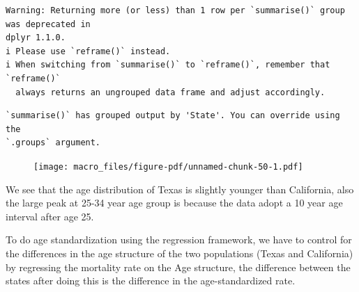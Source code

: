 \documentclass[
  letterpaper,
  DIV=11,
  numbers=noendperiod]{scrreprt}
\begin{document}
\begin{verbatim}
Warning: Returning more (or less) than 1 row per `summarise()` group was deprecated in
dplyr 1.1.0.
i Please use `reframe()` instead.
i When switching from `summarise()` to `reframe()`, remember that `reframe()`
  always returns an ungrouped data frame and adjust accordingly.
\end{verbatim}

\begin{verbatim}
`summarise()` has grouped output by 'State'. You can override using the
`.groups` argument.
\end{verbatim}

\begin{figure}[H]

{\centering \texttt{[image: macro\_files/figure-pdf/unnamed-chunk-50-1.pdf]}

}

\end{figure}

We see that the age distribution of Texas is slightly younger than
California, also the large peak at 25-34 year age group is because the
data adopt a 10 year age interval after age 25.

To do age standardization using the regression framework, we have to
control for the differences in the age structure of the two populations
(Texas and California) by regressing the mortality rate on the Age
structure, the difference between the states after doing this is the
difference in the age-standardized rate.
\end{document}
